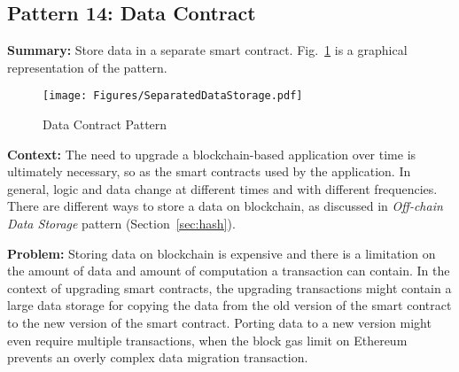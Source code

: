 
\subsection{ \textbf{Pattern 14: Data Contract}}
\label{sec:separate}

\noindent \textbf{Summary:} Store data in a separate smart contract. Fig.~\ref{fig:separated} is a graphical representation of the pattern.

\begin{figure}[t]
\begin{center}
\texttt{[image: Figures/SeparatedDataStorage.pdf]}
\caption{Data Contract Pattern}\label{fig:separated}
\end{center}
\end{figure}

\vspace{0.5em}\noindent \textbf{Context:} 
The need to upgrade a blockchain-based application over time is ultimately necessary, so as the smart contracts used by the application. In general, logic and data change at different times and with different frequencies. %
There are different ways to store a data on blockchain, as discussed in \emph{Off-chain Data Storage} pattern (Section~\ref{sec:hash}).%


\vspace{0.5em}\noindent \textbf{Problem:} 
Storing data on blockchain is expensive and there is a limitation on the amount of data and amount of computation a transaction can contain. In the context of upgrading smart contracts, the upgrading transactions might contain a large data storage for copying the data from the old version of the smart contract to the new version of the smart contract. Porting data to a new version might even require multiple transactions, \eg when the block gas limit on Ethereum prevents an overly complex data migration transaction.


